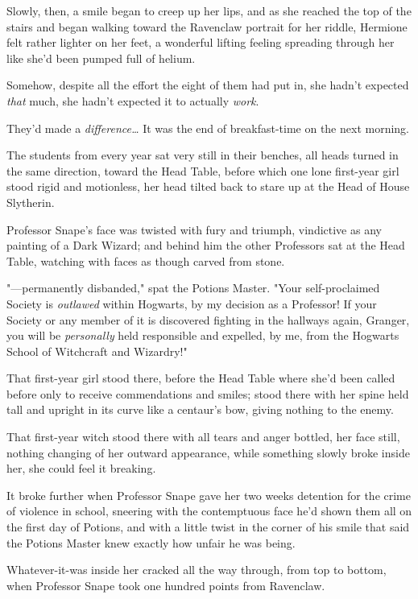 Slowly, then, a smile began to creep up her lips, and as she reached the top of
the stairs and began walking toward the Ravenclaw portrait for her riddle,
Hermione felt rather lighter on her feet, a wonderful lifting feeling spreading
through her like she'd been pumped full of helium.

Somehow, despite all the effort the eight of them had put in, she hadn't
expected \emph{that} much, she hadn't expected it to actually \emph{work}.

They'd made a \emph{difference…}
\later
It was the end of breakfast-time on the next morning.

The students from every year sat very still in their benches, all heads turned
in the same direction, toward the Head Table, before which one lone first-year
girl stood rigid and motionless, her head tilted back to stare up at the Head
of House Slytherin.

Professor Snape's face was twisted with fury and triumph, vindictive as any
painting of a Dark Wizard; and behind him the other Professors sat at the Head
Table, watching with faces as though carved from stone.

"—permanently disbanded," spat the Potions Master. "Your self-proclaimed
Society is \emph{outlawed} within Hogwarts, by my decision as a Professor! If
your Society or any member of it is discovered fighting in the hallways again,
Granger, you will be \emph{personally} held responsible and expelled, by me,
from the Hogwarts School of Witchcraft and Wizardry!"

That first-year girl stood there, before the Head Table where she'd been called
before only to receive commendations and smiles; stood there with her spine
held tall and upright in its curve like a centaur's bow, giving nothing to the
enemy.

That first-year witch stood there with all tears and anger bottled, her face
still, nothing changing of her outward appearance, while something slowly broke
inside her, she could feel it breaking.

It broke further when Professor Snape gave her two weeks detention for the
crime of violence in school, sneering with the contemptuous face he'd shown
them all on the first day of Potions, and with a little twist in the corner of
his smile that said the Potions Master knew exactly how unfair he was being.

Whatever-it-was inside her cracked all the way through, from top to bottom,
when Professor Snape took one hundred points from Ravenclaw.

